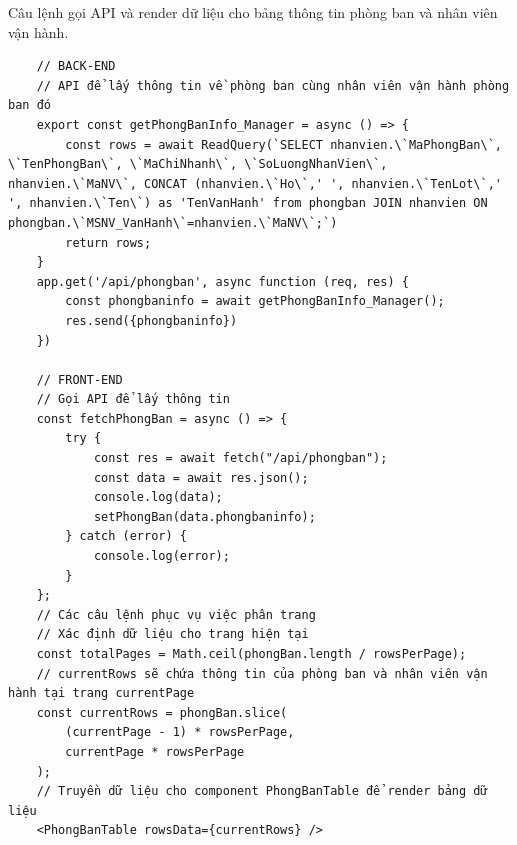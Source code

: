 \newpage
Câu lệnh gọi API và render dữ liệu cho bảng thông tin phòng ban và nhân viên vận hành.
\begin{verbatim}
    // BACK-END
    // API để lấy thông tin về phòng ban cùng nhân viên vận hành phòng ban đó
    export const getPhongBanInfo_Manager = async () => {
        const rows = await ReadQuery(`SELECT nhanvien.\`MaPhongBan\`, \`TenPhongBan\`, \`MaChiNhanh\`, \`SoLuongNhanVien\`, nhanvien.\`MaNV\`, CONCAT (nhanvien.\`Ho\`,' ', nhanvien.\`TenLot\`,' ', nhanvien.\`Ten\`) as 'TenVanHanh' from phongban JOIN nhanvien ON phongban.\`MSNV_VanHanh\`=nhanvien.\`MaNV\`;`)
        return rows;
    }
    app.get('/api/phongban', async function (req, res) {
        const phongbaninfo = await getPhongBanInfo_Manager();
        res.send({phongbaninfo})
    })

    // FRONT-END
    // Gọi API để lấy thông tin 
    const fetchPhongBan = async () => {
        try {
            const res = await fetch("/api/phongban");
            const data = await res.json();
            console.log(data);
            setPhongBan(data.phongbaninfo);
        } catch (error) {
            console.log(error);
        }
    };
    // Các câu lệnh phục vụ việc phân trang
    // Xác định dữ liệu cho trang hiện tại
    const totalPages = Math.ceil(phongBan.length / rowsPerPage);
    // currentRows sẽ chứa thông tin của phòng ban và nhân viên vận hành tại trang currentPage
    const currentRows = phongBan.slice(
        (currentPage - 1) * rowsPerPage,
        currentPage * rowsPerPage
    );
    // Truyền dữ liệu cho component PhongBanTable để render bảng dữ liệu
    <PhongBanTable rowsData={currentRows} />
\end{verbatim}

